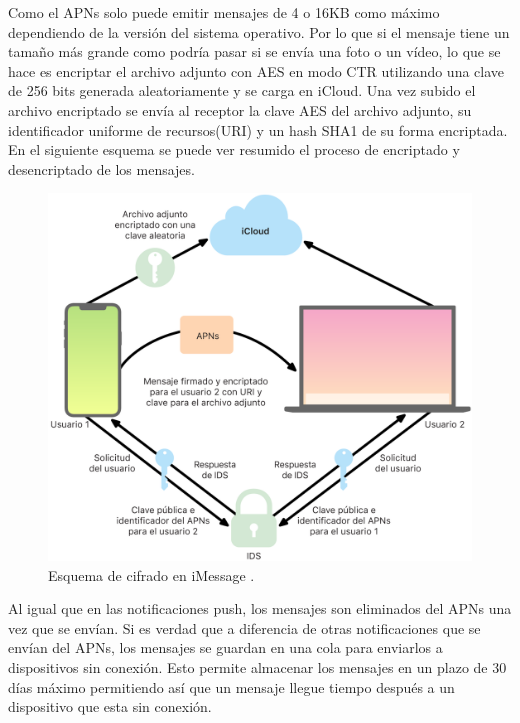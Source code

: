 Como el APNs solo puede emitir mensajes de 4 o 16KB como máximo dependiendo de la versión del sistema operativo. Por lo que si el mensaje tiene un tamaño más grande como podría pasar si se envía una foto o un vídeo, lo que se hace es encriptar el archivo adjunto con AES en modo CTR utilizando una clave de 256 bits generada aleatoriamente y se carga en iCloud. Una vez subido el archivo encriptado se envía al receptor la clave AES del archivo adjunto, su identificador uniforme de recursos(URI) y un hash SHA1 de su forma encriptada.\\
En el siguiente esquema se puede ver resumido el proceso de encriptado y desencriptado de los mensajes.
\begin{figure}[htb]
	\centering
	\includegraphics[scale=0.2]{imagenes/apple.png} 
	\caption{Esquema de cifrado en iMessage \cite{apple1}.}
	\label{mtproto2}
\end{figure}

Al igual que en las notificaciones push, los mensajes son eliminados del APNs una vez que se envían. Si es verdad que a diferencia de otras notificaciones que se envían del APNs, los mensajes se guardan en una cola para enviarlos a dispositivos sin conexión. Esto permite almacenar los mensajes en un plazo de 30 días máximo permitiendo así que un mensaje llegue tiempo después a un dispositivo que esta sin conexión.
